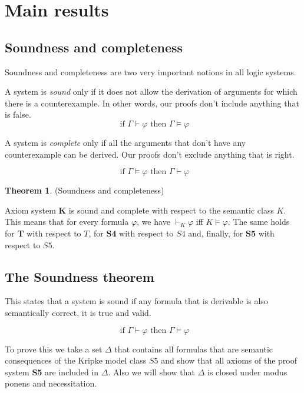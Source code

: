 \documentclass[12pt]{article}
\numberwithin{equation}{section}
\theoremstyle{definition}
\newtheorem{thm}{Theorem}[section]
\theoremstyle{definition}
\theoremstyle{remark}
\begin{document}
\newpage

\section{Main results}

\subsection{Soundness and completeness}

 Soundness and completeness are two very important notions in all logic systems. 
 
 A system is \textit{sound} only if it does not allow the derivation of arguments for which there is a counterexample. In other words, our proofs don't include anything that is false.
 $$
 \text{ if }   \Gamma \vdash \varphi   \text{ then }    \Gamma \models \varphi
 $$
 
 A system is \textit{complete} only if all the arguments that don't have any counterexample can be derived. Our proofs don't exclude anything that is right.

 $$
 \text{ if }   \Gamma \models \varphi   \text{ then }    \Gamma \vdash \varphi
 $$

\begin{thm}


(Soundness and completeness)

Axiom system \textbf{K} is sound and complete with respect to the semantic class $K$. This means that for every formula $\varphi$, we have $\vdash _K \varphi$ iff $K \models \varphi$.
The same holds for \textbf{T} with respect to $T$, for \textbf{S4} with respect to $S4$ and, finally, for \textbf{S5} with respect to $S5$.

\end{thm}

\subsection{The Soundness theorem}

This states that a system is sound if any formula that is derivable is also semantically correct, it is true and valid.

$$
 \text{ if }   \Gamma \vdash \varphi   \text{ then }    \Gamma \models \varphi
$$

To prove this we take a set $\Delta$ that contains all formulas that are semantic consequences of the Kripke model class $S5$ and show that all axioms of the proof system \textbf{S5} are included in $\Delta$. Also we will show that $\Delta$ is closed under modus ponens and necessitation.
\end{document}

